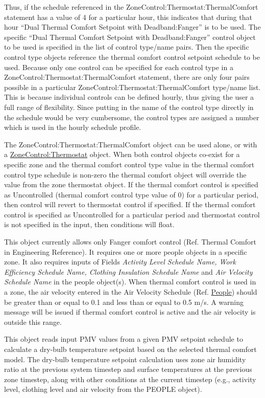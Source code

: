 Thus, if the schedule referenced in the ZoneControl:Thermostat:ThermalComfort statement has a value of 4 for a particular hour, this indicates that during that hour ``Dual Thermal Comfort Setpoint with Deadband:Fanger'' is to be used. The specific ``Dual Thermal Comfort Setpoint with Deadband:Fanger'' control object to be used is specified in the list of control type/name pairs. Then the specific control type objects reference the thermal comfort control setpoint schedule to be used. Because only one control can be specified for each control type in a ZoneControl:Thermostat:ThermalComfort statement, there are only four pairs possible in a particular ZoneControl:Thermostat:ThermalComfort type/name list. This is because individual controls can be defined hourly, thus giving the user a full range of flexibility. Since putting in the name of the control type directly in the schedule would be very cumbersome, the control types are assigned a number which is used in the hourly schedule profile.

The ZoneControl:Thermostat:ThermalComfort object can be used alone, or with a \hyperref[zonecontrolthermostat]{ZoneControl:Thermostat} object. When both control objects co-exist for a specific zone and the thermal comfort control type value in the thermal comfort control type schedule is non-zero the thermal comfort object will override the value from the zone thermostat object. If the thermal comfort control is specified as Uncontrolled (thermal comfort control type value of 0) for a particular period, then control will revert to thermostat control if specified. If the thermal comfort control is specified as Uncontrolled for a particular period and thermostat control is not specified in the input, then conditions will float.

This object currently allows only Fanger comfort control (Ref. Thermal Comfort in Engineering Reference). It requires one or more people objects in a specific zone. It also requires inputs of Fields \emph{Activity Level Schedule Name, Work Efficiency Schedule Name, Clothing Insulation Schedule Name} and \emph{Air Velocity Schedule Name} in the people object(s). When thermal comfort control is used in a zone, the air velocity entered in the Air Velocity Schedule (Ref. \hyperref[people]{People}) should be greater than or equal to 0.1 and less than or equal to 0.5 m/s. A warning message will be issued if thermal comfort control is active and the air velocity is outside this range.

This object reads input PMV values from a given PMV setpoint schedule to calculate a dry-bulb temperature setpoint based on the selected thermal comfort model. The dry-bulb temperature setpoint calculation uses zone air humidity ratio at the previous system timestep and surface temperatures at the previous zone timestep, along with other conditions at the current timestep (e.g., activity level, clothing level and air velocity from the PEOPLE object).

